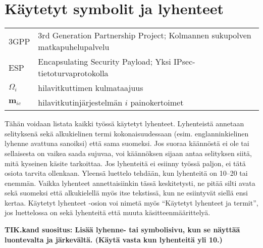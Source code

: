 %
%


\section*{Käytetyt symbolit ja lyhenteet}

\begin{center}
\begin{tabular}{p{}p{}}
3GPP  & 3rd Generation Partnership Project; Kolmannen sukupolven 
matkapuhelupalvelu \\ 
ESP & Encapsulating Security Payload; Yksi IPsec-tietoturvaprotokolla \\ 
$\Omega_i$ & hilavitkuttimen kulmataajuus \\
$\mathbf{m}_{ic}$ & hilavitkutinjärjestelmän $i$ painokertoimet \\
\end{tabular}
\end{center}

\vspace{10mm}

Tähän voidaan listata kaikki työssä käytetyt lyhenteet. Lyhenteistä
annetaan selityksenä sekä alkukielinen termi kokonaisuudessaan
(esim. englanninkielinen lyhenne avattuna sanoiksi) että sama
suomeksi. Jos suoraa käännöstä ei ole tai sellaisesta on vaikea saada
sujuvaa, voi käännöksen sijaan antaa selityksen siitä, mitä kyseinen
käsite tarkoittaa. Jos lyhenteitä ei esiinny työssä paljon, ei tätä
osiota tarvita ollenkaan. Yleensä luettelo tehdään, kun lyhenteitä on
10--20 tai enemmän. Vaikka lyhenteet annettaisiinkin tässä
keskitetysti, ne pitää silti avata sekä suomeksi että alkukielellä
myös itse tekstissä, kun ne esiintyvät siellä ensi kertaa.  Käytetyt
lyhenteet -osion voi nimetä myös ``Käytetyt lyhenteet ja termit'', jos
luettelossa on sekä lyhenteitä että muuta käsitteenmäärittelyä.

\textbf{TIK.kand suositus: Lisää lyhenne- tai symbolisivu, kun se
  näyttää luontevalta ja järkevältä. (Käytä vasta kun lyhenteitä yli 10.)}



